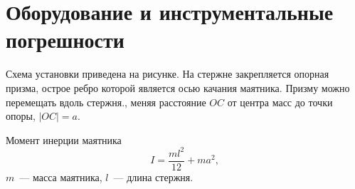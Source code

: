 \section{Оборудование и инструментальные погрешности}

\begin{figure}[h!]
\end{figure}

Схема установки приведена на рисунке. На стержне закрепляется опорная призма,
острое ребро которой является осью качания маятника. Призму можно перемещать
вдоль стержня., меняя расстояние $OC$ от центра масс до точки опоры, $\left|OC\right|=a$.

Момент инерции маятника
\[I=\frac{ml^2}{12}+ma^2,\]
$m$~--- масса маятника, $l$~--- длина стержня.

